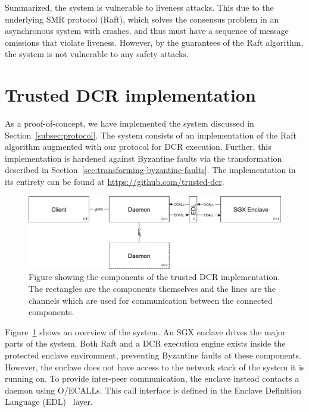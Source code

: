 \documentclass{article}
\begin{document}
        Summarized, the system is vulnerable to liveness attacks.
        This due to the underlying SMR protocol (Raft), which solves the consensus problem in an asynchronous system with crashes, and thus must have a sequence of message omissions that violate liveness.
        However, by the guarantees of the Raft algorithm, the system is not vulnerable to any safety attacks.

	\section{Trusted DCR implementation}

	As a proof-of-concept, we have implemented the system discussed in Section~\ref{subsec:protocol}.
	The system consists of an implementation of the Raft~\cite{ongaro_search_2014} algorithm augmented with our protocol for DCR execution.
	Further, this implementation is hardened against Byzantine faults via the transformation described in Section~\ref{sec:transforming-byzantine-faults}.
	The implementation in its entirety can be found at \url{https://github.com/trusted-dcr}.

	\begin{figure}[ht]
		\centering
		\includegraphics[width=\textwidth]{figures/dcr-graphs/network-stack.pdf}
		\caption{Figure showing the components of the trusted DCR implementation.
		The rectangles are the components themselves and the lines are the channels which are used for communication between the connected components. }
		\label{fig:network-stack}
	\end{figure}
	\FloatBarrier

	Figure~\ref{fig:network-stack} shows an overview of the system.
	An SGX enclave drives the major parts of the system.
	Both Raft and a DCR execution engine exists inside the protected enclave environment, preventing Byzantine faults at these components.
	However, the enclave does not have access to the network stack of the system it is running on.
	To provide inter-peer communication, the enclave instead contacts a daemon using O/ECALLs.
	This call interface is defined in the Enclave Definition Language (EDL)~\cite{intel_sgx_guide} layer.
\end{document}
